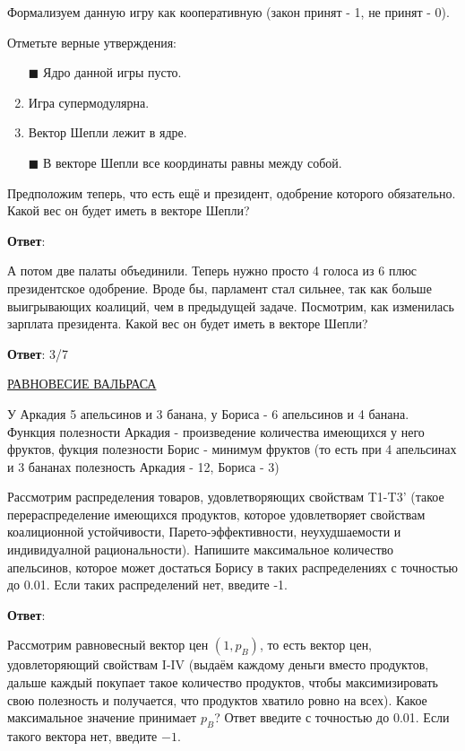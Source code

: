 Формализуем данную игру как кооперативную (закон принят - 1, не принят - 0).

Отметьте верные утверждения:

\begin{enumerate}[label=$\square$]
	\item[$\blacksquare$] Ядро данной игры пусто.
	\item Игра супермодулярна.
	\item Вектор Шепли лежит в ядре.
	\item[$\blacksquare$] В векторе Шепли все координаты равны между собой.
\end{enumerate}

\task
Предположим теперь, что есть ещё и президент, одобрение которого обязательно. Какой вес он будет иметь в векторе Шепли?

\textbf{Ответ}: 

\task
А потом две палаты объединили. Теперь нужно просто 4 голоса из 6 плюс президентское одобрение. Вроде бы, парламент стал сильнее, так как больше выигрывающих коалиций, чем в предыдущей задаче. Посмотрим, как изменилась зарплата президента. Какой вес он будет иметь в векторе Шепли?

\textbf{Ответ}: 
3/7  %

\task
\underline{РАВНОВЕСИЕ ВАЛЬРАСА}

У Аркадия 5 апельсинов и 3 банана, у Бориса - 6 апельсинов и 4 банана. Функция полезности Аркадия - произведение количества имеющихся у него фруктов, фукция полезности Борис - минимум фруктов (то есть при 4 апельсинах и 3 бананах полезность Аркадия - 12, Бориса - 3)

Рассмотрим распределения товаров, удовлетворяющих свойствам T1-T3' (такое перераспределение имеющихся продуктов, которое удовлетворяет свойствам коалиционной устойчивости, Парето-эффективности, неухудшаемости и индивидуалной рациональности). Напишите максимальное количество апельсинов, которое может достаться Борису в таких распределениях с точностью до 0.01. Если таких распределений нет, введите -1.

\textbf{Ответ}: 

\task
Рассмотрим равновесный вектор цен $(1,p_B)$, то есть вектор цен, удовлеторяющий свойствам I-IV (выдаём каждому деньги вместо продуктов, дальше каждый покупает такое количество продуктов, чтобы максимизировать свою полезность и получается, что продуктов хватило ровно на всех). Какое максимальное значение принимает $p_B$? Ответ введите с точностью до 0.01. Если такого вектора нет, введите $-1$.

